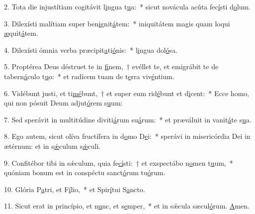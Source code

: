 2. Tota die injustítiam cogitávit l\uline{i}ngua t\uline{u}a:~* sicut novácula acúta fec\uline{í}sti d\uline{o}lum.\par 
3. Dilexísti malítiam super ben\uline{i}gnit\uline{á}tem:~* iniquitátem magis quam loqui \uline{æ}quit\uline{á}tem.\par 
4. Dilexísti ómnia verba præcipit\uline{a}ti\uline{ó}nis:~* l\uline{i}ngua dol\uline{ó}sa.\par 
5. Proptérea Deus déstruet te in \uline{fi}nem,~† evéllet te, et emigrábit te de tabern\uline{á}culo t\uline{u}o:~* et radícem tuam de t\uline{e}rra viv\uline{é}ntium.\par 
6. Vidébunt justi, et ti\uline{mé}bunt,~† et super eum rid\uline{é}bunt et d\uline{i}cent:~* Ecce homo, qui non pósuit Deum adjut\uline{ó}rem s\uline{u}um:\par 
7. Sed sperávit in multitúdine diviti\uline{á}rum su\uline{á}rum:~* et præváluit in vanit\uline{á}te s\uline{u}a.\par 
8. Ego autem, sicut olíva fructífera in d\uline{o}mo D\uline{e}i:~* sperávi in misericórdia Dei in ætérnum: et in s\uline{ǽ}culum s\uline{ǽ}culi.\par 
9. Confitébor tibi in sǽculum, quia fe\uline{cí}sti:~† et exspectábo n\uline{o}men t\uline{u}um,~* quóniam bonum est in conspéctu sanct\uline{ó}rum tu\uline{ó}rum.\par 
10. Glória P\uline{a}tri, et F\uline{í}lio,~* et Spir\uline{í}tui S\uline{a}ncto.\par 
11. Sicut erat in princípio, et n\uline{u}nc, et s\uline{e}mper,~* et in sǽcula sæcul\uline{ó}rum. \uline{A}men.\par 

